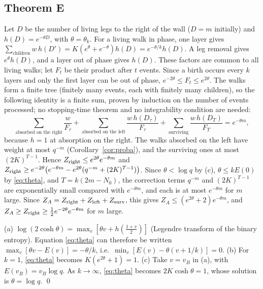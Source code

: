 \subsection{Theorem E}\label{app:E}

Let $D$ be the number of living legs to the right of the wall ($D=m$ initially) and $h(D)=e^{-\theta D}$, with $\theta=\theta_k$. For a living walk in phase, one layer gives $\sum_{\text{children}}w\,h(D')=K(e^{\theta}+e^{-\theta})h(D)=e^{-\theta/k}h(D)$. A leg removal gives $e^{\theta}h(D)$, and a layer out of phase gives $h(D)$. These factors are common to all living walks; let $F_t$ be their product after $t$ events. Since a birth occurs every $k$ layers and only the first layer can be out of phase, $e^{-2\theta}\le F_t\le e^{2\theta}$. The walks form a finite tree (finitely many events, each with finitely many children), so the following identity is a finite sum, proven by induction on the number of events processed; no stopping-time theorem and no integrability condition are needed:
\[
\sum_{\text{absorbed on the right}}\frac{w}{F_\tau}+\sum_{\text{absorbed on the left}}\frac{w\,h(D_\tau)}{F_\tau}+\sum_{\text{surviving}}\frac{w\,h(D_T)}{F_T}=e^{-\theta m},
\]
because $h=1$ at absorption on the right. The walks absorbed on the left have weight at most $q^{-m}$ (Corollary~\ref{cor:proba}), and the surviving ones at most $(2K)^{T-1}$. Hence $Z_{\rm right}\le e^{2\theta}e^{-\theta m}$ and $Z_{\rm right}\ge e^{-2\theta}\big(e^{-\theta m}-e^{2\theta}(q^{-m}+(2K)^{T-1})\big)$. Since $\theta<\log q$ by (c), $\theta\le kE(0)$ by \eqref{eq:theta}, and $T=k(2m-N_0)$, the correction terms $q^{-m}$ and $(2K)^{T-1}$ are exponentially small compared with $e^{-\theta m}$, and each is at most $e^{-\theta m}$ for $m$ large. Since $Z_A=Z_{\rm right}+Z_{\rm left}+Z_{\rm surv}$, this gives $Z_A\le(e^{2\theta}+2)e^{-\theta m}$, and $Z_A\ge Z_{\rm right}\ge\frac12e^{-2\theta}e^{-\theta m}$ for $m$ large.

(a) $\log(2\cosh\theta)=\max_v[\theta v+h(\frac{1+v}2)]$ (Legendre transform of the binary entropy). Equation \eqref{eq:theta} can therefore be written $\max_v[\theta v-E(v)]=-\theta/k$, i.e.\ $\min_v[E(v)-\theta(v+1/k)]=0$.
(b) For $k=1$, \eqref{eq:theta} becomes $K(e^{2\theta}+1)=1$.
(c) Take $v=v_B$ in (a), with $E(v_B)=v_B\log q$. As $k\to\infty$, \eqref{eq:theta} becomes $2K\cosh\theta=1$, whose solution is $\theta=\log q$.
\qed
